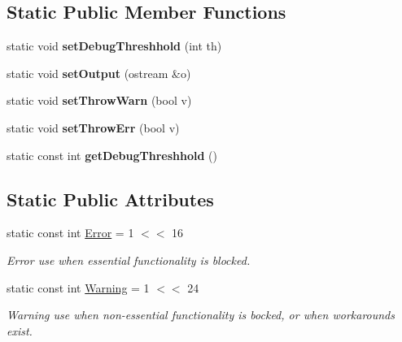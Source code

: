 \subsection*{Static Public Member Functions}
\begin{DoxyCompactItemize}
\item 
\hypertarget{classDebugOut_a5eb2fb8c9db45f812b5dadb2fd63dcee}{static void {\bfseries set\+Debug\+Threshhold} (int th)}\label{classDebugOut_a5eb2fb8c9db45f812b5dadb2fd63dcee}

\item 
\hypertarget{classDebugOut_a89fc39319cc80007a0188b831fae32c1}{static void {\bfseries set\+Output} (ostream \&o)}\label{classDebugOut_a89fc39319cc80007a0188b831fae32c1}

\item 
\hypertarget{classDebugOut_a0651b00c0d62d93a9c57209874b2650c}{static void {\bfseries set\+Throw\+Warn} (bool v)}\label{classDebugOut_a0651b00c0d62d93a9c57209874b2650c}

\item 
\hypertarget{classDebugOut_a59402f0300c1b41f7290c8274cd08c58}{static void {\bfseries set\+Throw\+Err} (bool v)}\label{classDebugOut_a59402f0300c1b41f7290c8274cd08c58}

\item 
\hypertarget{classDebugOut_af4903a2f68a012000cc91562d0183e2a}{static const int {\bfseries get\+Debug\+Threshhold} ()}\label{classDebugOut_af4903a2f68a012000cc91562d0183e2a}

\end{DoxyCompactItemize}
\subsection*{Static Public Attributes}
\begin{DoxyCompactItemize}
\item 
\hypertarget{classDebugOut_a40314aef0df2ed8a705d9372d49b0535}{static const int \hyperlink{classDebugOut_a40314aef0df2ed8a705d9372d49b0535}{Error} = 1 $<$$<$ 16}\label{classDebugOut_a40314aef0df2ed8a705d9372d49b0535}

\begin{DoxyCompactList}\small\item\em Error use when essential functionality is blocked. \end{DoxyCompactList}\item 
\hypertarget{classDebugOut_a7a06aa04dd6cb8c1e9bcd083d30d91ad}{static const int \hyperlink{classDebugOut_a7a06aa04dd6cb8c1e9bcd083d30d91ad}{Warning} = 1 $<$$<$ 24}\label{classDebugOut_a7a06aa04dd6cb8c1e9bcd083d30d91ad}

\begin{DoxyCompactList}\small\item\em Warning use when non-\/essential functionality is bocked, or when workarounds exist. \end{DoxyCompactList}\end{DoxyCompactItemize}


